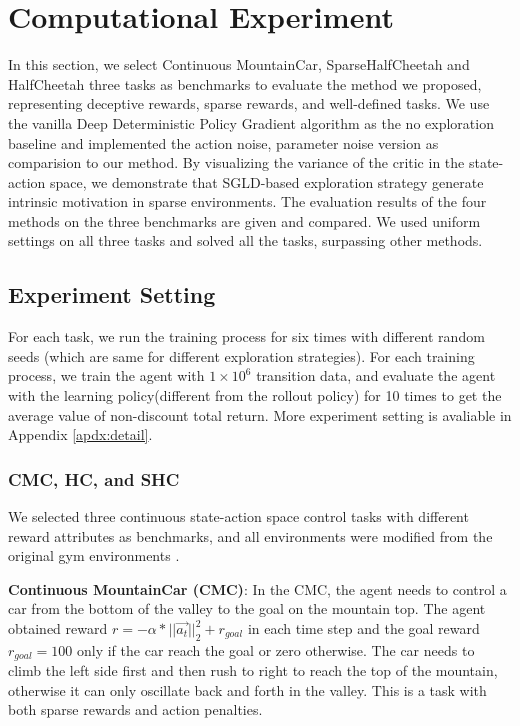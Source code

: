 \section{Computational Experiment}
In this section, we select Continuous MountainCar, SparseHalfCheetah and HalfCheetah three tasks as benchmarks to evaluate the method we proposed, representing deceptive rewards, sparse rewards, and well-defined tasks. We use the vanilla Deep Deterministic Policy Gradient algorithm as the no exploration baseline and implemented the action noise, parameter noise version as comparision to our method. By visualizing the variance of the critic in the state-action space, we demonstrate that SGLD-based exploration strategy generate intrinsic motivation in sparse environments. The evaluation results of the four methods on the three benchmarks are given and compared. We used uniform settings on all three tasks and solved all the tasks, surpassing other methods.

\subsection{Experiment Setting}
For each task, we run the training process for six times with different random seeds (which are same for different exploration strategies). For each training process, we train the agent with $1\times10^6$ transition data, and evaluate the agent with the learning policy(different from the rollout policy) for 10 times to get the average value of non-discount total return. More experiment setting is avaliable in Appendix \ref{apdx:detail}.

\subsubsection{CMC, HC, and SHC}
We selected three continuous state-action space control tasks with different reward attributes as benchmarks, and all environments were modified from the original gym environments \cite{gym}.

\textbf{Continuous MountainCar (CMC)}\cite{MC}: In the CMC, the agent needs to control a car from the bottom of the valley to the goal on the mountain top. The agent obtained reward $r = -\alpha*||\vec{a_t}||^2_2 + r_{goal}$ in each time step and the goal reward $r_{goal}=100$ only if the car reach the goal or zero otherwise. The car needs to climb the left side first and then rush to right to reach the top of the mountain, otherwise it can only oscillate back and forth in the valley. This is a task with both sparse rewards and action penalties.

